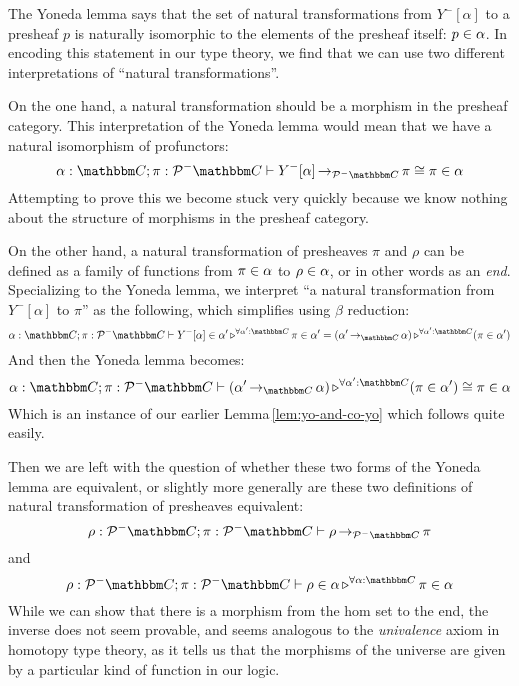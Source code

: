 \documentclass{llncs}
\begin{document}
The Yoneda lemma says that the set of natural transformations from
$Y^-[\alpha]$ to a presheaf $p$ is naturally isomorphic to the
elements of the presheaf itself: $p\in \alpha$. In
encoding this statement in our type theory, we find that we can use
two different interpretations of ``natural transformations''.

On the one hand, a natural transformation should be a morphism in the
presheaf category. This interpretation of the Yoneda lemma would mean
that we have a natural isomorphism of profunctors:
\[ \alpha:\cat C; \pi:\negPresheaf {\cat C} \vdash \punitinXfromYtoZ{\negPresheaf {\cat C}} {Y^-[\alpha]} {\pi} \cong \negPresheafApp \alpha \pi \]
Attempting to prove this we become stuck very quickly because we know
nothing about the structure of morphisms in the presheaf category.

On the other hand, a natural transformation of presheaves $\pi$ and
$\rho$ can be defined as a family of functions from $\pi\in \alpha$ to $\rho\in \alpha$, or in other words as an
\emph{end}. Specializing to the Yoneda lemma, we interpret ``a natural
transformation from $Y^-[\alpha]$ to $\pi$'' as the following, which simplifies using $\beta$ reduction:
\[ \alpha:\cat C; \pi:\negPresheaf {\cat C} \vdash \homrallXYtoZ {\alpha':\cat C} {\negPresheafApp {\alpha'} {Y^-[\alpha]}}{\negPresheafApp {\alpha'} \pi} = \homrallXYtoZ {\alpha':\cat C} {(\punitinXfromYtoZ {\cat C}{\alpha'}{\alpha})}{(\negPresheafApp {\alpha'} \pi)} \]
And then the Yoneda lemma becomes:
\[ \alpha:\cat C; \pi:\negPresheaf {\cat C} \vdash \homrallXYtoZ {\alpha':\cat C} {(\punitinXfromYtoZ {\cat C}{\alpha'}{\alpha})}{(\negPresheafApp {\alpha'} \pi)} \cong \negPresheafApp \alpha \pi\]
Which is an instance of our earlier Lemma\,\ref{lem:yo-and-co-yo}
which follows quite easily.

Then we are left with the question of whether these two forms of the
Yoneda lemma are equivalent, or slightly more generally are these two definitions of natural transformation of presheaves equivalent:
\[ \rho:\negPresheaf{\cat C}; \pi:\negPresheaf {\cat C} \vdash \punitinXfromYtoZ{\negPresheaf {\cat C}} {\rho} {\pi} \]
and
\[ \rho:\negPresheaf{\cat C}; \pi:\negPresheaf {\cat C} \vdash \homrallXYtoZ {\alpha:\cat C} {\negPresheafApp \alpha \rho}{\negPresheafApp \alpha \pi} \]
While we can show that there is a morphism from the hom set to the
end, the inverse does not seem provable, and seems analogous to the
\emph{univalence} axiom in homotopy type theory, as it tells us that
the morphisms of the universe are given by a particular kind of
function in our logic.
\end{document}
